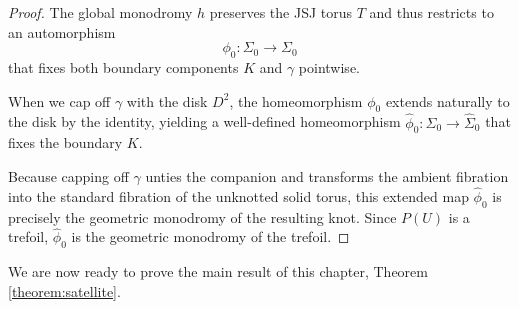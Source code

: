 \begin{proof}
    The global monodromy $h$ preserves the JSJ torus $T$ and thus restricts to an automorphism
    \[
    \phi_0 \colon \Sigma_0 \to \Sigma_0
    \]
    that fixes both boundary components $K$ and $\gamma$ pointwise.

    When we cap off $\gamma$ with the disk $D^2$, the homeomorphism $\phi_0$ extends naturally to the disk by the identity, yielding a well-defined homeomorphism $\widehat{\phi}_0 \colon \widehat{\Sigma}_0 \to \widehat{\Sigma}_0$ that fixes the boundary $K$.

    Because capping off $\gamma$ unties the companion and transforms the ambient fibration into the standard fibration of the unknotted solid torus, this extended map $\widehat{\phi}_0$ is precisely the geometric monodromy of the resulting knot. Since $P(U)$ is a trefoil, $\widehat{\phi}_0$ is the geometric monodromy of the trefoil.
\end{proof}

We are now ready to prove the main result of this chapter, Theorem \ref{theorem:satellite}.

